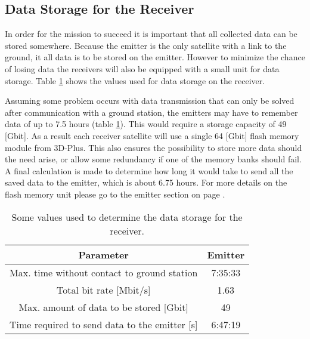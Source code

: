 \subsection{Data Storage for the Receiver}
\label{DSReceiver}

In order for the mission to succeed it is important that all collected data can be stored somewhere. Because the emitter is the only satellite with a link to the ground, it all data is to be stored on the emitter. However to minimize the chance of losing data the receivers will also be equipped with a small unit for data storage. Table \ref{DSReceiverTable} shows the values used for data storage on the receiver. 

Assuming some problem occurs with data transmission that can only be solved after communication with a ground station, the emitters may have to remember data of up to 7.5 hours (table \ref{DSReceiverTable}). This would require a storage capacity of 49 [Gbit]. As a result each receiver satellite will use a single 64 [Gbit] flash memory module from 3D-Plus. This also ensures the possibility to store more data should the need arise, or allow some redundancy if one of the memory banks should fail. A final calculation is made to determine how long it would take to send all the saved data to the emitter, which is about 6.75 hours. For more details on the flash memory unit please go to the emitter section on page \pageref{DSEmitter}.

\begin{table}
\centering
\begin{tabular}{c|c}
\textbf{Parameter}  & \textbf{Emitter} \\\hline\hline
	Max. time without contact to ground station & 7:35:33 \\
	Total bit rate [Mbit/s] & 1.63 \\
	Max. amount of data to be stored [Gbit] & 49 \\
	Time required to send data to the emitter [s] & 6:47:19 \\
\end{tabular}
\caption{Some values used to determine the data storage for the receiver.}
\label{DSReceiverTable}
\end{table}